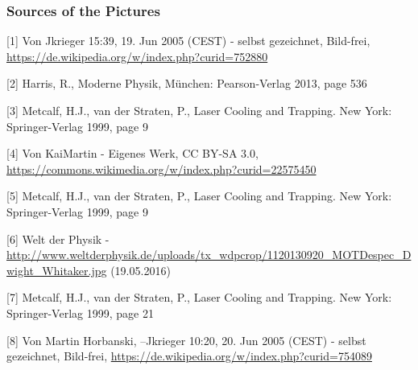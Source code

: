 \documentclass[aspectratio=169]{beamer}
\begin{document}
\begin{frame}
  \frametitle{Sources of the Pictures}
     {\small
     [1] Von Jkrieger 15:39, 19. Jun 2005 (CEST) - selbst gezeichnet, Bild-frei, \url{https://de.wikipedia.org/w/index.php?curid=752880} 
      
     [2] Harris, R., Moderne Physik, München: Pearson-Verlag 2013, page 536
     
     [3] Metcalf, H.J., van der Straten, P., Laser Cooling and Trapping. New York: Springer-Verlag 1999, page 9
     
     [4] Von KaiMartin - Eigenes Werk, CC BY-SA 3.0, \url{https://commons.wikimedia.org/w/index.php?curid=22575450}
     
     [5] Metcalf, H.J., van der Straten, P., Laser Cooling and Trapping. New York: Springer-Verlag 1999, page 9
     
     [6] Welt der Physik - \url{http://www.weltderphysik.de/uploads/tx_wdpcrop/1120130920_MOTDespec_Dwight_Whitaker.jpg} (19.05.2016)
     
     [7] Metcalf, H.J., van der Straten, P., Laser Cooling and Trapping. New York: Springer-Verlag 1999, page 21
     
     [8] Von Martin Horbanski, --Jkrieger 10:20, 20. Jun 2005 (CEST) - selbst gezeichnet, Bild-frei, \url{https://de.wikipedia.org/w/index.php?curid=754089}
     
     }
     
\end{frame}

%
%  
%  
%  
%  
%  
%  
\end{document}
